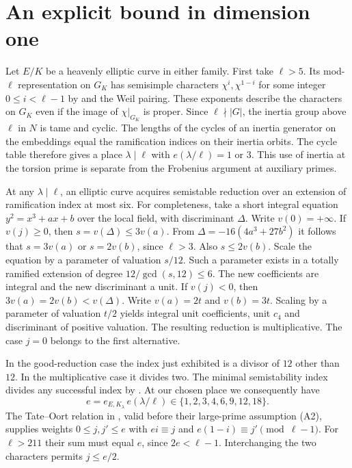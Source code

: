 \documentclass[11pt]{article}
\begin{document}
\section{An explicit bound in dimension one}

Let $E/K$ be a heavenly elliptic curve in either family. First take
$\ell>5$. Its mod-$\ell$ representation on $G_K$ has semisimple
characters $\chi^i,\chi^{1-i}$ for some integer $0\le i<\ell-1$
by \cite[Lem.~3.3]{rt} and the Weil pairing. These exponents describe
the characters on $G_K$ even if the image of $\chi|_{G_K}$ is proper.
Since $\ell\nmid|G|$, the inertia group above $\ell$ in $N$ is tame
and cyclic. The lengths of the cycles of an inertia generator on the
embeddings equal the ramification indices on their inertia orbits.
The cycle table therefore gives a place $\lambda\mid\ell$ with
$e(\lambda/\ell)=1$ or $3$. This use of inertia at the torsion prime
is separate from the Frobenius argument at auxiliary primes.

At any $\lambda\mid\ell$, an elliptic curve
acquires semistable reduction over an extension of ramification index
at most six. For completeness, take a short integral equation
$y^2=x^3+ax+b$ over the local field, with discriminant $\Delta$.
Write $v(0)=+\infty$. If $v(j)\ge0$, then $s=v(\Delta)\le3v(a)$.
From $\Delta=-16(4a^3+27b^2)$ it follows that
$s=3v(a)$ or $s=2v(b)$, since $\ell>3$.
Also $s\le2v(b)$. Scale the equation by a parameter of valuation
$s/12$. Such a parameter exists in a totally ramified extension of
degree $12/\gcd(s,12)\le6$. The new coefficients are integral and
the new discriminant a unit. If $v(j)<0$, then
$3v(a)=2v(b)<v(\Delta)$. Write $v(a)=2t$ and $v(b)=3t$.
Scaling by a parameter of valuation $t/2$ yields integral unit
coefficients, unit $c_4$ and discriminant of positive valuation.
The resulting reduction is multiplicative. The case $j=0$ belongs
to the first alternative.

In the good-reduction case the index just exhibited is a divisor of
$12$ other than $12$. In the multiplicative case it divides two.
The minimal semistability index divides any successful index by
\cite[\S3.1]{rt}. At our chosen place we consequently have
\[
 e=e_{E,K_\lambda}\,e(\lambda/\ell)
       \in\{1,2,3,4,6,9,12,18\}.
\]
The Tate--Oort relation in \cite[(3.1)]{rt}, valid before their
large-prime assumption (A2), supplies weights $0\le j,j'\le e$
with $ei\equiv j$ and $e(1-i)\equiv j'\pmod{\ell-1}$.
For $\ell>211$ their sum must equal $e$, since $2e<\ell-1$.
Interchanging the two characters permits $j\le e/2$.
\end{document}

